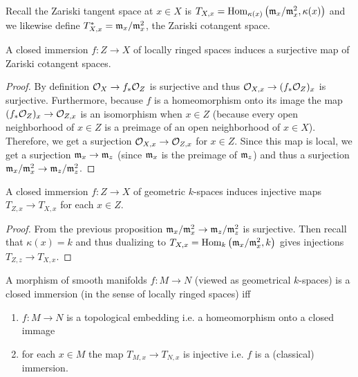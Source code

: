 \documentclass[12pt]{article}
\begin{document}
\begin{rmk}
Recall the Zariski tangent space at $x \in X$ is $T_{X,x} = \mathrm{Hom}_{\kappa(x)} \left( \mathfrak{m}_x / \mathfrak{m}_x^2, \kappa(x) \right)$ and we likewise define $T^*_{X,x} = \mathfrak{m}_x / \mathfrak{m}_x^2$, the Zariski cotangent space.
\end{rmk}

\begin{prop}
A closed immersion $f : Z \to X$ of locally ringed spaces induces a surjective map of Zariski cotangent spaces.
\end{prop}

\begin{proof}
By definition $\mathcal{O}_{X} \to f_* \mathcal{O}_{Z}$ is surjective and thus $\mathcal{O}_{X, x} \to (f_* \mathcal{O}_{Z})_x$ is surjective. Furthermore, because $f$ is a homeomorphism onto its image the map $(f_* \mathcal{O}_{Z})_x \to \mathcal{O}_{Z, x}$ is an isomorphism when $x \in Z$ (because every open neighborhood of $x \in Z$ is a preimage of an open neighborhood of $x \in X$). Therefore, we get a surjection $\mathcal{O}_{X, x} \to \mathcal{O}_{Z, x}$ for $x \in Z$. Since this map is local, we get a surjection $\mathfrak{m}_x \to \mathfrak{m}_z$ (since $\mathfrak{m}_x$ is the preimage of $\mathfrak{m}_z$) and thus a surjection $\mathfrak{m}_x / \mathfrak{m}_x^2 \to \mathfrak{m}_z / \mathfrak{m}_z^2$.  
\end{proof}

\begin{prop}
A closed immersion $f : Z \to X$ of geometric $k$-spaces induces injective maps $T_{Z, x} \to T_{X, x}$ for each $x \in Z$.
\end{prop}

\begin{proof}
From the previous proposition $\mathfrak{m}_x / \mathfrak{m}_x^2 \to \mathfrak{m}_z / \mathfrak{m}_z^2$ is surjective. Then recall that $\kappa(x) = k$ and thus dualizing to $T_{X, x} = \mathrm{Hom}_{k} \left( \mathfrak{m}_x / \mathfrak{m}_x^2, k \right)$ gives injections $T_{Z,z} \to T_{X, x}$.
\end{proof}

\newcommand{\R}{\mathbb{R}}

\begin{prop}
A morphism of smooth manifolds $f : M \to N$ (viewed as geometrical $k$-spaces) is a closed immersion (in the sense of locally ringed spaces) iff
\begin{enumerate}
\item $f : M \to N$ is a topological embedding i.e. a homeomorphism onto a closed immage
\item for each $x \in M$ the map $T_{M,x} \to T_{N,x}$ is injective i.e. $f$ is a (classical) immersion.
\end{enumerate}
\end{prop}
\end{document}
